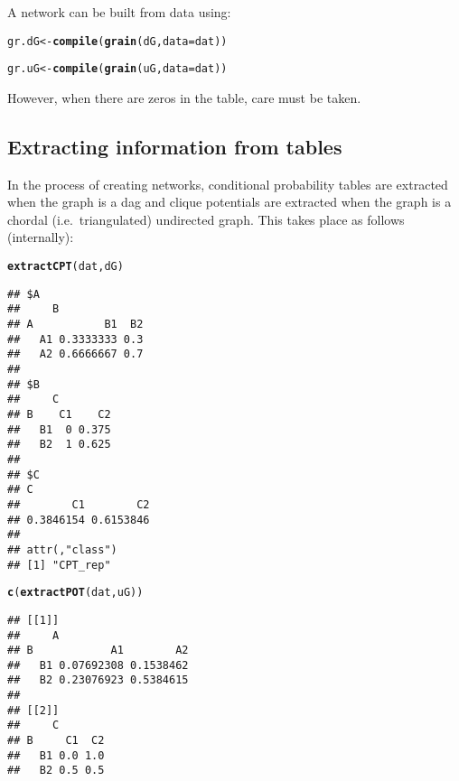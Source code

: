\documentclass[10pt]{article}\usepackage[]{graphicx}\usepackage[]{color}
\makeatletter
\newcommand{\hlstd}[1]{\textcolor[rgb]{0.345,0.345,0.345}{#1}}%
\newcommand{\hlkwb}[1]{\textcolor[rgb]{0.69,0.353,0.396}{#1}}%
\newcommand{\hlkwc}[1]{\textcolor[rgb]{0.333,0.667,0.333}{#1}}%
\newcommand{\hlkwd}[1]{\textcolor[rgb]{0.737,0.353,0.396}{\textbf{#1}}}%
\newenvironment{kframe}{%
 \def\at@end@of@kframe{}%
 \ifinner\ifhmode%
  \def\at@end@of@kframe{\end{minipage}}%
  \begin{minipage}{\columnwidth}%
 \fi\fi%
 \def\FrameCommand##1{\hskip\@totalleftmargin \hskip-\fboxsep
 \colorbox{shadecolor}{##1}\hskip-\fboxsep
     \hskip-\linewidth \hskip-\@totalleftmargin \hskip\columnwidth}%
 \MakeFramed {\advance\hsize-\width
   \@totalleftmargin\z@ \linewidth\hsize
   \@setminipage}}%
 {\par\unskip\endMakeFramed%
 \at@end@of@kframe}
\newenvironment{knitrout}{}{} %
\makeatother
\begin{document}
A network can be built from data using:

\begin{knitrout}
\color{fgcolor}\begin{kframe}
\begin{alltt}
\hlstd{gr.dG} \hlkwb{<-} \hlkwd{compile}\hlstd{(} \hlkwd{grain}\hlstd{( dG,} \hlkwc{data}\hlstd{=dat ) )}
\end{alltt}


{\ttfamily\noindent\bfseries\color{errorcolor}{\#\# Error in compileCPT(object): A list is expected}}\begin{alltt}
\hlstd{gr.uG} \hlkwb{<-} \hlkwd{compile}\hlstd{(} \hlkwd{grain}\hlstd{( uG,} \hlkwc{data}\hlstd{=dat ) )}
\end{alltt}
\end{kframe}
\end{knitrout}

However, when there are zeros in the table, care must be taken.

\subsection{Extracting information from tables}
\label{sec:extr-inform-from}

In the process of creating networks, conditional probability tables
are extracted when the graph is a dag and clique potentials are
extracted when the graph is a chordal (i.e.\ triangulated) undirected
graph. This takes place as follows (internally):

\begin{knitrout}
\color{fgcolor}\begin{kframe}
\begin{alltt}
\hlkwd{extractCPT}\hlstd{(dat, dG)}
\end{alltt}
\begin{verbatim}
## $A
##     B
## A           B1  B2
##   A1 0.3333333 0.3
##   A2 0.6666667 0.7
## 
## $B
##     C
## B    C1    C2
##   B1  0 0.375
##   B2  1 0.625
## 
## $C
## C
##        C1        C2 
## 0.3846154 0.6153846 
## 
## attr(,"class")
## [1] "CPT_rep"
\end{verbatim}
\begin{alltt}
\hlkwd{c}\hlstd{(}\hlkwd{extractPOT}\hlstd{(dat, uG ))}
\end{alltt}
\begin{verbatim}
## [[1]]
##     A
## B            A1        A2
##   B1 0.07692308 0.1538462
##   B2 0.23076923 0.5384615
## 
## [[2]]
##     C
## B     C1  C2
##   B1 0.0 1.0
##   B2 0.5 0.5
\end{verbatim}
\end{kframe}
\end{knitrout}
\end{document}
